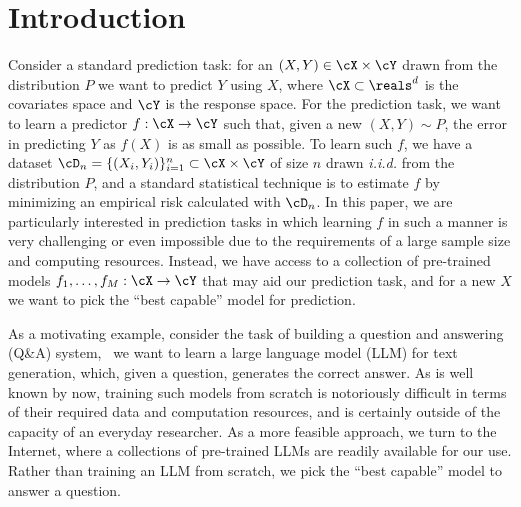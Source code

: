\section{Introduction}
\label{sec:intro}



Consider a standard prediction task: for an $(X, Y) \in \cX \times \cY$ drawn from the distribution $P$ we want to predict $Y$ using $X$, where $\cX \subset \reals^d$ is the covariates space and $\cY$ is the response space. For the prediction task, we want to learn a predictor $f : \cX \to \cY$ such that, given a new $(X, Y) \sim P$, the error in predicting $Y$ as $f(X)$ is as small as possible. To learn such $f$, we have a dataset $\cD_n = \{(X_i, Y_i)\}_{i = 1}^n \subset \cX \times \cY$ of size $n$ drawn \emph{i.i.d.} from the distribution $P$, and a standard statistical technique is to estimate $f$ by minimizing an empirical risk calculated with $\cD_n$. 
In this paper, we are particularly interested in prediction tasks in which learning $f$ in such a manner is very challenging or even impossible due to the requirements of a large sample size and computing resources. Instead, we have access to a collection of pre-trained models $f_1, \dots, f_M: \cX \to \cY$ that may aid our prediction task, and for a new $X$ we want to pick the ``best capable'' model for prediction.  


As a motivating example, consider the task of building a question and answering (Q\&A) system, \ie\ we want to learn a large language model (LLM) for text generation, which, given a question, generates the correct answer. As is well known by now, training such models from scratch is notoriously difficult in terms of their required data and computation resources, and is certainly outside of the capacity of an everyday researcher. As a more feasible approach, we turn to the Internet, where a collections of pre-trained LLMs are readily available for our use. Rather than training an LLM from scratch, we pick the ``best capable'' model to answer a question.


